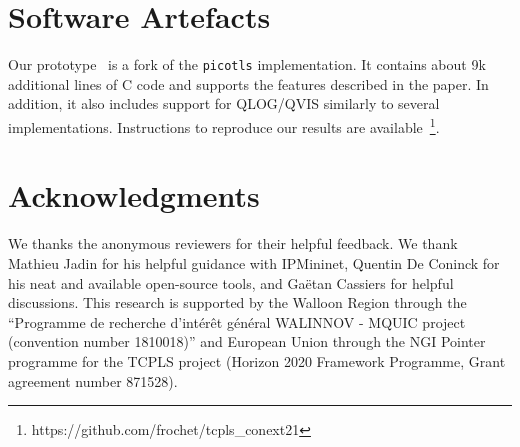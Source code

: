 %


\section*{Software Artefacts}

Our \tcpls prototype~\cite{frochet-github-picotcpls} is a fork of the
\texttt{picotls}  implementation.  It contains about 9k additional lines
of C code and supports the features described in the paper. In addition, it also
includes support for QLOG/QVIS \cite{marx2020debugging} similarly to several
\quic implementations. Instructions to reproduce our results are
available~\footnote{https://github.com/frochet/tcpls\_conext21}.


\section*{Acknowledgments}

We thanks the anonymous reviewers for their helpful feedback. We thank Mathieu
Jadin for his helpful guidance with IPMininet, Quentin De Coninck for his neat
and available open-source tools, and Gaëtan Cassiers for helpful discussions.
This research is supported by the Walloon Region through the ``Programme de
recherche d'intérêt général WALINNOV - MQUIC project (convention number
1810018)'' and European Union through the NGI Pointer programme for the TCPLS
project (Horizon 2020 Framework Programme, Grant agreement number 871528).


